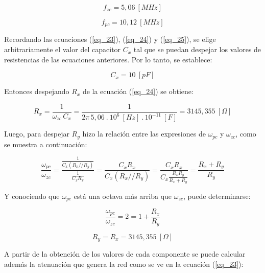 \documentclass[12pt,a4paper]{article}
\begin{document}
\begin{equation}
\label{eq_92}
f_{zc} = 5,06~[MHz]
\end{equation}

\begin{equation}
\label{eq_93}
f_{pc} = 10,12~[MHz]
\end{equation}
\hspace{0.5 cm}

Recordando las ecuaciones (\ref{eq_23}), (\ref{eq_24}) y (\ref{eq_25}), se elige arbitrariamente el valor del capacitor $C_x$ tal que se puedan despejar los valores de resistencias de las ecuaciones anteriores. Por lo tanto, se establece:

\begin{equation}
\label{eq_94}
C_x = 10~[pF]
\end{equation}
\hspace{0.5 cm}

Entonces despejando $R_x$ de la ecuación (\ref{eq_24}) se obtiene:

\begin{equation}
\label{eq_95}
R_x = \frac{1}{\omega_{zc}\,C_x} = \frac{1}{2 \pi \, 5,06~.~10^6~[Hz]~.\,10^{-11}~[F]} = 3145,355 ~[\Omega]
\end{equation}
\hspace{0.5 cm}

Luego, para despejar $R_y$ hizo la relación entre las expresiones de $\omega_{pc}$ y $\omega_{zc}$, como se muestra a continuación:

\begin{equation}
\label{eq_96}
\frac{\omega_{pc}}{\omega_{zc}} = \frac{\frac{1}{C_x(R_x//R_y)}}{\frac{1}{C_xR_x}} = \frac{C_xR_x}{C_x(R_x//R_y)}= \frac{C_xR_x}{C_x\frac{R_xR_y}{R_x + R_y}} = \frac{R_x + R_y}{R_y}
\end{equation}
\hspace{0.5 cm}

Y conociendo que $\omega_{pc}$ está una octava más arriba que $\omega_{zc}$, puede determinarse:

\begin{equation}
\label{eq_97}
\frac{\omega_{pc}}{\omega_{zc}} = 2 = 1+\frac{R_x}{R_y}
\end{equation}

\begin{equation}
\label{eq_98}
R_y =R_x = 3145,355~[\Omega]
\end{equation}
\hspace{0.5 cm}

A partir de la obtención de los valores de cada componente se puede calcular además la atenuación que genera la red como se ve en la ecuación (\ref{eq_23}):
\end{document}
